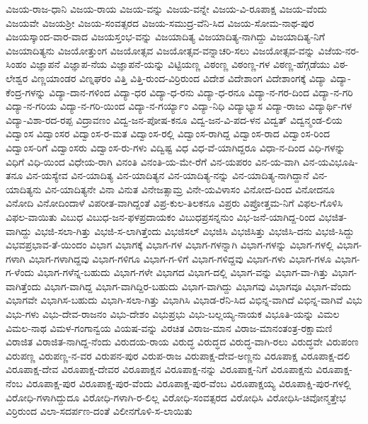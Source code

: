 {ವಿಜಯ-ರಾಜ-ಧಾನಿ
ವಿಜಯ-ರಾಯ
ವಿಜಯ-ವನ್ನು
ವಿಜಯ-ವನ್ನೇ
ವಿಜಯ-ವಿ-ರೂಪಾಕ್ಷ
ವಿಜಯ-ವೆಂದು
ವಿಜಯವೇ
ವಿಜಯಶ್ರೀ
ವಿಜಯ-ಸಂವತ್ಸರದ
ವಿಜಯ-ಸಮುದ್ರ-ವೆನಿ-ಸಿದ
ವಿಜಯ-ಸೋಮ-ನಾಥ-ಪುರ
ವಿಜಯಸ್ಕಾಂದ-ವಾರ-ವಾದ
ವಿಜಯಸ್ತಂಭ-ವನ್ನು
ವಿಜಯಾದಿತ್ಯ
ವಿಜಯಾದಿತ್ಯ-ನಾಗಿದ್ದು
ವಿಜಯಾದಿತ್ಯ-ನಿಗೆ
ವಿಜಯಾದಿತ್ಯನು
ವಿಜಯೋತ್ತುಂಗ
ವಿಜಯೋತ್ಸವ
ವಿಜಯೋತ್ಸವ-ವನ್ನಾಚರಿ-ಸಲು
ವಿಜಯೋತ್ಸವ-ವನ್ನು
ವಿಜೆಯ-ನರ-ಸಿಂಹಂ
ವಿಜ್ಞಾಪನೆ
ವಿಜ್ಞಾಪ-ನೆಯ
ವಿಜ್ಞಾಪನೆ-ಯನ್ನು
ವಿಟ್ಟಿಯಣ್ಣ
ವಿಠಂಣ್ಣ
ವಿಠಂಣ್ಣ-ಗಳ
ವಿಠಣ್ಣ-ಹೆಗ್ಗಡೆಯು
ವಿಠ-ಲೇಶ್ವರ
ವಿಣ್ಣಯಾಂಡರ
ವಿಣ್ನಘರಂ
ವಿತ್ತಿ
ವಿತ್ತಿ-ರುಂದ-ವಿರ್ರಿರುಂದ
ವಿದೇಶ
ವಿದೇಶಾಂಗ
ವಿದೇಶಾಂಗಕ್ಕೆ
ವಿದ್ಯಾ
ವಿದ್ಯಾ-ಕೆಂದ್ರ-ಗಳನ್ನು
ವಿದ್ಯಾ-ದಾನ-ಗಳಿಂದ
ವಿದ್ಯಾ-ಧರ
ವಿದ್ಯಾ-ಧ-ರನು
ವಿದ್ಯಾ-ಧ-ರನೂ
ವಿದ್ಯಾ-ನ-ಗರ-ದಿಂದ
ವಿದ್ಯಾ-ನ-ಗರಿ
ವಿದ್ಯಾ-ನ-ಗರಿಯ
ವಿದ್ಯಾ-ನ-ಗರಿ-ಯಿಂದ
ವಿದ್ಯಾ-ನ-ಗರ್ಯ್ಯಾಂ
ವಿದ್ಯಾ-ನಿಧಿ
ವಿದ್ಯಾಭ್ಯಾಸ
ವಿದ್ಯಾ-ರಾಜು
ವಿದ್ಯಾರ್ಥಿ-ಗಳ
ವಿದ್ಯಾ-ವಿಶಾ-ರದ-ರಪ್ಪ
ವಿದ್ರಾವಣಂ
ವಿದ್ವ-ಜನ-ಪೋಷ-ಕನೂ
ವಿದ್ವ-ಜನ-ವಿ-ಪದ-ಳನ
ವಿದ್ವತ್
ವಿದ್ವನ್ಮಂಡ-ಲಿಯ
ವಿದ್ವಾಂಸ
ವಿದ್ವಾಂಸರ
ವಿದ್ವಾಂಸ-ರ-ಮತ
ವಿದ್ವಾಂಸ-ರಲ್ಲಿ
ವಿದ್ವಾಂಸ-ರಾಗಿದ್ದ
ವಿದ್ವಾಂಸ-ರಾದ
ವಿದ್ವಾಂಸ-ರಿಂದ
ವಿದ್ವಾಂಸ-ರಿಗೆ
ವಿದ್ವಾಂಸರು
ವಿದ್ವಾಂಸ-ರು-ಗಳು
ವಿದ್ವಿಷ್ಟ
ವಿಧ
ವಿಧ-ವೆ-ಯಾಗಿದ್ದರೂ
ವಿಧಾ-ನ-ದಿಂದ
ವಿಧಿ-ಗಳನ್ನು
ವಿಧಿಗೆ
ವಿಧಿ-ಯಿಂದ
ವಿಧೇಯ-ರಾಗಿ
ವಿನಂತಿ
ವಿನಂತಿ-ಯ-ಮೇ-ರೆಗೆ
ವಿನ-ಯಪರಂ
ವಿನ-ಯ-ವಾಗಿ
ವಿನ-ಯವಿಭೂಷಿ-ತನೂ
ವಿನ-ಯಸ್ಯೇವ
ವಿನ-ಯಾದಿತ್ಯ
ವಿನ-ಯಾದಿತ್ಯನ
ವಿನ-ಯಾದಿತ್ಯ-ನನ್ನು
ವಿನ-ಯಾದಿತ್ಯ-ನಾಗಿದ್ದಾನೆ
ವಿನ-ಯಾದಿತ್ಯನು
ವಿನ-ಯಾದಿತ್ಯನೇ
ವಿನಾ
ವಿನುತ
ವಿನೇಜತ್ಸಾಮ್ರ
ವಿನೇ-ಯವಿಳಾಸಂ
ವಿನೋದ-ದಿಂದ
ವಿನೋದನೂ
ವಿನೋದಿ
ವಿನೋದಿಂದಾಳೆ
ವಿಪರೀತ-ವಾಗಿದ್ದಂತೆ
ವಿಪ್ರ-ಕುಲ-ತಿಲಕನೂ
ವಿಪ್ರರು
ವಿಪ್ರೋತ್ತಮ-ನಿಗೆ
ವಿಫಲ-ಗೊಳಿಸಿ
ವಿಫಲ-ವಾಯಿತು
ವಿಬುಧ
ವಿಬುಧ-ಜನ-ಫಳಪ್ರದಾಯಕಂ
ವಿಬುಧಪ್ರಸನ್ನನುಂ
ವಿಭ-ಜನೆ-ಯಾಗಿದ್ದ-ರಿಂದ
ವಿಭಜಿತ-ವಾಗಿದ್ದು
ವಿಭಜಿ-ಸಲಾ-ಗಿತ್ತು
ವಿಭಜಿ-ಸ-ಲಾಗಿತ್ತೆಂದು
ವಿಭಜಿಸಲ್
ವಿಭಜಿಸಿ
ವಿಭಜಿಸಿತ್ತು
ವಿಭಜಿಸಿ-ದನು
ವಿಭಜಿ-ಸಿದ್ದು
ವಿಭವಪ್ರಭಾವ-ತೆ-ಯಿಂದಂ
ವಿಭಾಗ
ವಿಭಾಗಕ್ಕೆ
ವಿಭಾಗ-ಗಳ
ವಿಭಾಗ-ಗಳನ್ನಾಗಿ
ವಿಭಾಗ-ಗಳನ್ನು
ವಿಭಾಗ-ಗಳಲ್ಲಿ
ವಿಭಾಗ-ಗಳಾಗಿ
ವಿಭಾಗ-ಗಳಾಗಿದ್ದವು
ವಿಭಾಗ-ಗಳಿಗೂ
ವಿಭಾಗ-ಗ-ಳಿಗೆ
ವಿಭಾಗ-ಗಳಿದ್ದವು
ವಿಭಾಗ-ಗಳು
ವಿಭಾಗ-ಗಳೂ
ವಿಭಾಗ-ಗ-ಳೆಂದು
ವಿಭಾಗ-ಗಳೆನ್ನ-ಬಹುದು
ವಿಭಾಗ-ಗಳೇ
ವಿಭಾಗದ
ವಿಭಾಗ-ದಲ್ಲಿ
ವಿಭಾಗ-ವನ್ನು
ವಿಭಾಗ-ವಾ-ಗಿತ್ತು
ವಿಭಾಗ-ವಾಗಿತ್ತೆಂದು
ವಿಭಾಗ-ವಾಗಿದ್ದ
ವಿಭಾಗ-ವಾಗಿದ್ದಿರ-ಬಹುದು
ವಿಭಾಗ-ವಾಗಿದ್ದು
ವಿಭಾಗವು
ವಿಭಾಗವೂ
ವಿಭಾಗ-ವೆಂದು
ವಿಭಾಗವೇ
ವಿಭಾಗಿಸ-ಬಹುದು
ವಿಭಾಗಿ-ಸಲಾ-ಗಿತ್ತು
ವಿಭಾಗಿಸಿ
ವಿಭಾಡ-ರೆನಿ-ಸಿದ
ವಿಭಿನ್ನ-ವಾಗಿದೆ
ವಿಭಿನ್ನ-ವಾಗಿವೆ
ವಿಭು
ವಿಭು-ಗಳು
ವಿಭು-ದೇವ-ರಾಜನಂ
ವಿಭು-ದೇಶಂ
ವಿಭುಪ್ರಭು
ವಿಭು-ಬಲ್ಲಯ್ಯ-ನಾಯಕ
ವಿಭೂತಿ-ಯನ್ನು
ವಿಮಲ
ವಿಮಲ-ನಾಥ
ವಿಮಳ-ಗಂಗಾನ್ವಯ
ವಿಯಷ-ವನ್ನು
ವಿರಚಿತ
ವಿರಾಜ-ಮಾನ
ವಿರಾಜ-ಮಾನಂತಂತ್ರ-ರಕ್ಷಾಮಣಿ
ವಿರಾಜಿತ
ವಿರಾಜಿತ-ನಾಗಿದ್ದ-ನೆಂದು
ವಿರುದಯ-ರಾಯ
ವಿರುದ್ಧ
ವಿರುದ್ಧದ
ವಿರುದ್ಧ-ವಾಗಿ-ರಲು
ವಿರುದ್ಧವೇ
ವಿರುಪಂಣ
ವಿರುಪಣ್ಣ
ವಿರುಪಣ್ಣ-ನ-ವರ
ವಿರುಪನ-ಪುರ
ವಿರುಪ-ರಾಜ
ವಿರುಪಾಕ್ಷ-ದೇವ-ಅಣ್ಣನು
ವಿರೂಪಾಕ್ಷ
ವಿರೂಪಾಕ್ಷ-ದಲಿ
ವಿರೂಪಾಕ್ಷ-ದೇವ
ವಿರೂಪಾಕ್ಷ-ದೇವರ
ವಿರೂಪಾಕ್ಷನ
ವಿರೂಪಾಕ್ಷ-ನನ್ನು
ವಿರೂಪಾಕ್ಷ-ನಿಗೆ
ವಿರೂಪಾಕ್ಷನು
ವಿರೂಪಾಕ್ಷ-ನೆಂಬ
ವಿರೂಪಾಕ್ಷ-ಪುರ
ವಿರೂಪಾಕ್ಷ-ಪುರ-ವೆಂದು
ವಿರೂಪಾಕ್ಷ-ಪುರ-ವೆಂಬ
ವಿರೂಪಾಕ್ಷಯ್ಯ
ವಿರೂಪಾಕ್ಷಿ-ಪುರ-ಗಳಲ್ಲಿ
ವಿರೋಧಿ-ಗಳಾಗಿದ್ದುದೂ
ವಿರೋಧಿ-ಗಳಾಗಿ-ರ-ಲಿಲ್ಲ
ವಿರೋಧಿ-ಸಂವತ್ಸರದ
ವಿರೋಧಿಸಿ
ವಿರೋಧಿಸಿ-ಚಿವೋನ್ಮತ್ತೇಭ
ವಿರ್ರಿರುಂದ
ವಿಲಾ-ಸದರ್ಪಣ-ದಂತೆ
ವಿಲೀನಗೊಳಿ-ಸ-ಲಾಯಿತು
}
